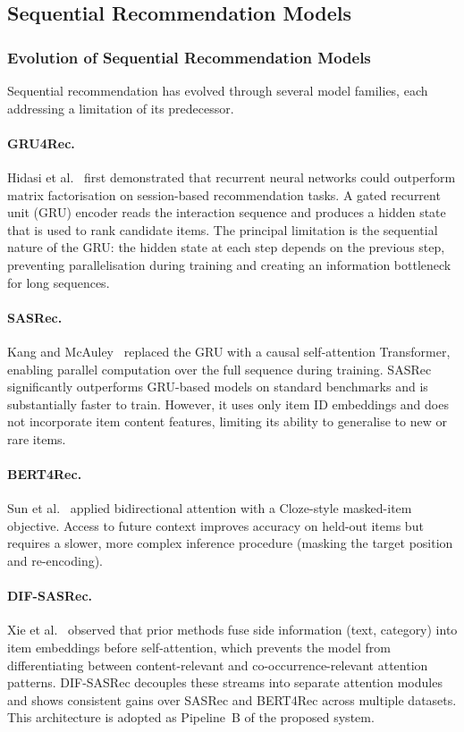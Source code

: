 \subsection{Sequential Recommendation Models}
\label{sec:existing_solutions}

\subsubsection{Evolution of Sequential Recommendation Models}

Sequential recommendation has evolved through several model families, each addressing a limitation of its predecessor.

\paragraph{GRU4Rec.}
Hidasi et al.~\cite{hidasi2016gru4rec} first demonstrated that recurrent neural networks could outperform matrix factorisation on session-based recommendation tasks.
A gated recurrent unit (GRU) encoder reads the interaction sequence and produces a hidden state that is used to rank candidate items.
The principal limitation is the sequential nature of the GRU: the hidden state at each step depends on the previous step, preventing parallelisation during training and creating an information bottleneck for long sequences.

\paragraph{SASRec.}
Kang and McAuley~\cite{kang2018self} replaced the GRU with a causal self-attention Transformer, enabling parallel computation over the full sequence during training.
SASRec significantly outperforms GRU-based models on standard benchmarks and is substantially faster to train.
However, it uses only item ID embeddings and does not incorporate item content features, limiting its ability to generalise to new or rare items.

\paragraph{BERT4Rec.}
Sun et al.~\cite{sun2019bert4rec} applied bidirectional attention with a Cloze-style masked-item objective.
Access to future context improves accuracy on held-out items but requires a slower, more complex inference procedure (masking the target position and re-encoding).

\paragraph{DIF-SASRec.}
Xie et al.~\cite{xie2022difsasrec} observed that prior methods fuse side information (text, category) into item embeddings before self-attention, which prevents the model from differentiating between content-relevant and co-occurrence-relevant attention patterns.
DIF-SASRec decouples these streams into separate attention modules and shows consistent gains over SASRec and BERT4Rec across multiple datasets.
This architecture is adopted as Pipeline~B of the proposed system.

